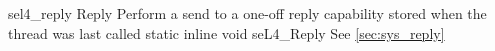 %
%
%
%

\apidoc
{sel4_reply}
{Reply}
{Perform a send to a one-off reply capability stored when the thread was last called}
{static inline void seL4\_Reply}
{
}
{\noret}
{See \autoref{sec:sys_reply}}
